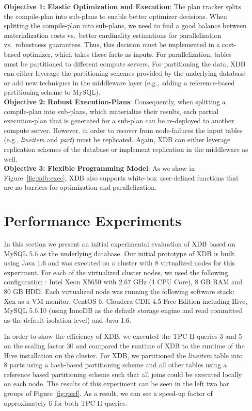 \documentclass{sig-alternate}
\begin{document}
{\bf Objective 1:  Elastic Optimization and Execution}: The plan tracker splits the compile-plan into sub-plans to enable better optimizer decisions. When splitting the compile-plan into sub-plans, we need to find a good balance between materialization costs vs.\ better cardinality estimations for parallelization vs.\ robustness guarantees. Thus, this decision must be implemented in a cost-based optimizer, which takes these facts as inputs. For parallelization,  tables must be partitioned to different compute servers. For partitioning the data, XDB can either leverage the partitioning schemes provided by the underlying database or add new techniques in the middleware layer (e.g., adding a reference-based partitioning scheme to MySQL).\\

{\bf Objective 2:  Robust Execution-Plans}: Consequently, when splitting a compile-plan into sub-plans, which materialize their results, each partial execution-plan that is generated for a sub-plan can be re-deployed to another compute server. However, in order to recover from node-failures the input tables (e.g., \emph{lineitem} and \emph{part}) must be replicated. Again, XDB can either leverage replication schemes of the database or implement replication in the middleware as well.\\

{\bf Objective 3:  Flexible Programming Model}: As we show in Figure~\ref{fig:xdb:exec}, XDB also supports white-box user-defined functions that are no barriers for optimization and parallelization. 

\section{Performance Experiments}
\label{sec:perf}

In this section we present an initial experimental evaluation of XDB based on MySQL 5.6 as the underlying database. Our initial prototype of XDB is built using Java 1.6 and was executed on a cluster with 8 virtualized nodes for this experiment.  
For each of the virtualized cluster nodes, we used the following configuration : Intel Xeon X5650 with 2.67 GHz (1 CPU Core), 8 GB RAM and 80 GB HDD. Each virtualized node was running the following software stack: Xen as a VM monitor, CentOS 6, Cloudera CDH 4.5 Free Edition including Hive, MySQL 5.6.10 (using InnoDB as the default storage engine and read committed as the default isolation level) and Java 1.6.

In order to show the efficiency of XDB, we executed the TPC-H queries 3 and 5 on the scaling factor 30 and compared the runtime of XDB to the runtime of the Hive installation on the cluster. For XDB, we partitioned the \emph{lineitem} table into 8 parts using a hash-based partitioning scheme and all other tables using a reference based partitioning scheme such that all joins could be executed locally on each node. The results of this experiment can be seen in the left two bar groups of Figure \ref{fig:perf}.
As a result, we can see a speed-up factor of approximately 6 for both TPC-H queries.
 
\end{document}
